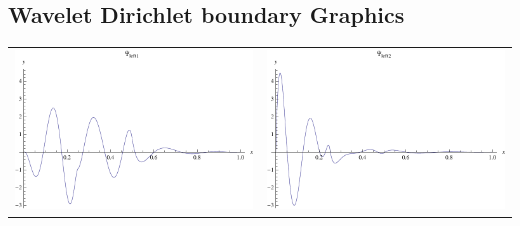 \documentclass{article}
\begin{document}
\begin{landscape}
\subsection{Wavelet Dirichlet boundary Graphics}
\begin{tabular}{cc}
\includegraphics[width=10.cm]{septic_wavelet_dleft_1.pdf}& \includegraphics[width=10.cm]{septic_wavelet_dleft_2.pdf} \\
\end{tabular} 
 \\ 
\begin{tabular}{cc}

\end{tabular}
\end{landscape}
\end{document}

